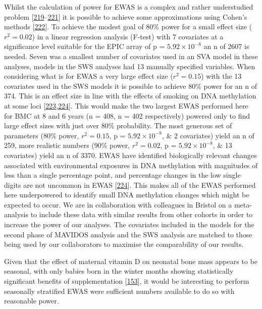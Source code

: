 \documentclass[
]{book}
\begin{document}
Whilst the calculation of power for EWAS is a complex and rather understudied problem {[}\protect\hyperlink{ref-Wang2011}{219}--\protect\hyperlink{ref-Graw2019}{221}{]} it is possible to achieve some approximations using Cohen's methods {[}\protect\hyperlink{ref-Cohen1988}{222}{]}.
To achieve the modest goal of 80\% power for a small effect size (\(r^2 = 0.02\)) in a linear regression analysis (F-test) with 7 covariates at a significance level suitable for the EPIC array of p = \(5.92\times10^{-8}\) an n of 2607 is needed.
Seven was a smallest number of covariates used in an SVA model in these analyses, models in the SWS analyses had 13 manually specified variables.
When considering what is for EWAS a very large effect size (\(r^2 = 0.15\)) with the 13 covariates used in the SWS models it is possible to achieve 80\% power for an n of 374.
This is an effect size in line with the effects of smoking on DNA methylation at some loci {[}\protect\hyperlink{ref-Joubert2016}{223},\protect\hyperlink{ref-Breton2017}{224}{]}.
This would make the two largest EWAS performed here for BMC at 8 and 6 years (n = 408, n = 402 respectively) powered only to find large effect sizes with just over 80\% probability.
The most generous set of parameters (80\% power, \(r^2 = 0.15\), p = \(5.92\times10^{-8}\), \& 2 covariates) yield an n of 259, more realistic numbers (90\% power, \(r^2 = 0.02\), p = \(5.92\times10^{-8}\), \& 13 covariates) yield an n of 3370.
EWAS have identified biologically relevant changes associated with environmental exposures in DNA methylation with magnitudes of less than a single percentage point, and percentage changes in the low single digits are not uncommon in EWAS {[}\protect\hyperlink{ref-Breton2017}{224}{]}.
This makes all of the EWAS performed here underpowered to identify small DNA methylation changes which might be expected to occur.
We are in collaboration with colleagues in Bristol on a meta-analysis to include these data with similar results from other cohorts in order to increase the power of our analyses.
The covariates included in the models for the second phase of MAVIDOS analysis and the SWS analysis are matched to those being used by our collaborators to maximise the comparability of our results.

Given that the effect of maternal vitamin D on neonatal bone mass appears to be seasonal, with only babies born in the winter months showing statistically significant benefits of supplementation {[}\protect\hyperlink{ref-Cooper2016}{153}{]}, it would be interesting to perform seasonally stratified EWAS were sufficient numbers available to do so with reasonable power.
\end{document}

